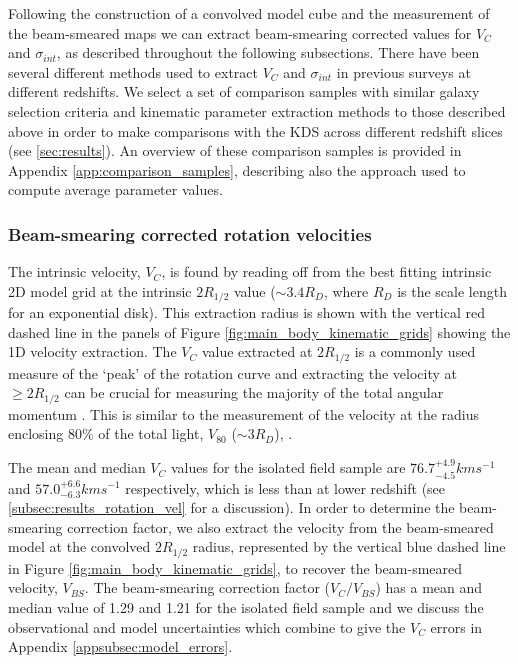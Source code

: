 \documentclass[fleqn,usenatbib]{mn2e}
\begin{document}
Following the construction of a convolved model cube and the measurement of the beam-smeared maps we can extract beam-smearing corrected values for $V_{C}$ and $\sigma_{int}$, as described throughout the following subsections.
There have been several different methods used to extract $V_{C}$ and $\sigma_{int}$ in previous surveys at different redshifts.
We select a set of comparison samples with similar galaxy selection criteria and kinematic parameter extraction methods to those described above in order to make comparisons with the KDS across different redshift slices (see \cref{sec:results}).
An overview of these comparison samples is provided in Appendix \ref{app:comparison_samples}, describing also the approach used to compute average parameter values.

\subsubsection{Beam-smearing corrected rotation velocities}\label{subsubsec:beam_smearing_corrected_velocities}
The intrinsic velocity, $V_{C}$, is found by reading off from the best fitting intrinsic 2D model grid at the intrinsic $2R_{1/2}$ value ($\sim3.4R_{D}$, where $R_{D}$ is the scale length for an exponential disk).
This extraction radius is shown with the vertical red dashed line in the panels of Figure \ref{fig:main_body_kinematic_grids} showing the 1D velocity extraction.
The $V_{C}$ value extracted at $2R_{1/2}$ is a commonly used measure of the `peak' of the rotation curve \citep[e.g.][]{Miller2011,Stott2016,Pelliccia2017,Harrison2017,Swinbank2017} and extracting the velocity at $\geqslant 2R_{1/2}$ can be crucial for measuring the majority of the total angular momentum \citep[e.g.][]{Obreschkow2015,Harrison2017,Swinbank2017}.
This is similar to the measurement of the velocity at the radius enclosing 80$\%$ of the total light, $V_{80}$ ($\sim3R_{D}$), \citep{Tiley2016a}.

The mean and median $V_{C}$ values for the isolated field sample are $76.7^{+4.9}_{-4.5}kms^{-1}$ and $57.0^{+6.6}_{-6.3}kms^{-1}$ respectively, which is less than at lower redshift (see \cref{subsec:results_rotation_vel} for a discussion).
In order to determine the beam-smearing correction factor, we also extract the velocity from the beam-smeared model at the convolved $2R_{1/2}$ radius, represented by the vertical blue dashed line in Figure \ref{fig:main_body_kinematic_grids}, to recover the beam-smeared velocity, $V_{BS}$.
The beam-smearing correction factor ($V_{C}/V_{BS}$) has a mean and median value of 1.29 and 1.21 for the isolated field sample and we discuss the observational and model uncertainties which combine to give the $V_{C}$ errors in Appendix \ref{appsubsec:model_errors}. \\
\end{document}
